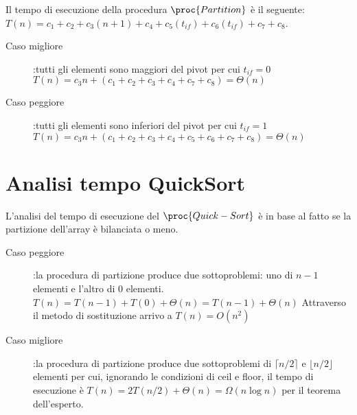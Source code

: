 
Il tempo di esecuzione della procedura $\proc{Partition}$ è il seguente:
$T(n) = c_1 + c_2 + c_3(n+1) + c_4 + c_5(t_{if}) + c_6(t_{if}) + c_7 + c_8$.

\begin{description}
  \item[Caso migliore]:tutti gli elementi sono maggiori del pivot per cui $t_{if} = 0$
        $T(n) = c_3n + (c_1+c_2+c_3+c_4+c_7+c_8) = \Theta(n)$
  \item[Caso peggiore]:tutti gli elementi sono inferiori del pivot per cui $t_{if} = 1$
        $T(n) = c_3n + (c_1+c_2+c_3+c_4+c_5+c_6+c_7+c_8) = \Theta(n)$
\end{description}

\section{Analisi tempo QuickSort}
L'analisi del tempo di esecuzione del $\proc{Quick-Sort}$ è in base al fatto se
la partizione dell'array è bilanciata o meno.
\begin{description}
  \item[Caso peggiore]:la procedura di partizione produce due sottoproblemi:
        uno di $n-1$ elementi e l'altro di $0$ elementi.
        $T(n) = T(n-1) + T(0) + \Theta(n)
              = T(n-1) + \Theta(n)$
        Attraverso il metodo di sostituzione arrivo a $T(n) = O(n^2)$
  \item[Caso migliore]:la procedura di partizione produce due sottoproblemi di $\lceil n/2 \rceil$
        e $\lfloor n/2 \rfloor$ elementi per cui, ignorando le condizioni di ceil e floor,
        il tempo di esecuzione è $T(n) = 2T(n/2) + \Theta(n) = \Omega(n \log n)$ per il teorema dell'esperto.

\end{description}


